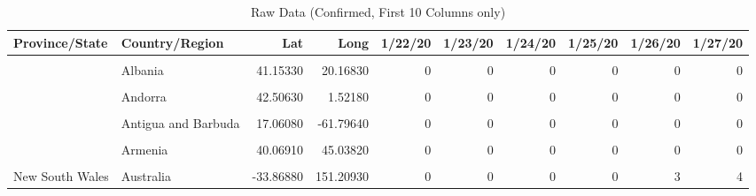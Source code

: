 \begin{table}[!h]

\caption{\label{tab:}Raw Data (Confirmed, First 10 Columns only)}
\centering
\fontsize{5}{7}\selectfont
\begin{tabular}[t]{llrrrrrrrr}
\toprule
Province/State & Country/Region & Lat & Long & 1/22/20 & 1/23/20 & 1/24/20 & 1/25/20 & 1/26/20 & 1/27/20\\
\midrule
\cellcolor{gray!6}{} & \cellcolor{gray!6}{Afghanistan} & \cellcolor{gray!6}{33.93911} & \cellcolor{gray!6}{67.70995} & \cellcolor{gray!6}{0} & \cellcolor{gray!6}{0} & \cellcolor{gray!6}{0} & \cellcolor{gray!6}{0} & \cellcolor{gray!6}{0} & \cellcolor{gray!6}{0}\\
 & Albania & 41.15330 & 20.16830 & 0 & 0 & 0 & 0 & 0 & 0\\
\cellcolor{gray!6}{} & \cellcolor{gray!6}{Algeria} & \cellcolor{gray!6}{28.03390} & \cellcolor{gray!6}{1.65960} & \cellcolor{gray!6}{0} & \cellcolor{gray!6}{0} & \cellcolor{gray!6}{0} & \cellcolor{gray!6}{0} & \cellcolor{gray!6}{0} & \cellcolor{gray!6}{0}\\
 & Andorra & 42.50630 & 1.52180 & 0 & 0 & 0 & 0 & 0 & 0\\
\cellcolor{gray!6}{} & \cellcolor{gray!6}{Angola} & \cellcolor{gray!6}{-11.20270} & \cellcolor{gray!6}{17.87390} & \cellcolor{gray!6}{0} & \cellcolor{gray!6}{0} & \cellcolor{gray!6}{0} & \cellcolor{gray!6}{0} & \cellcolor{gray!6}{0} & \cellcolor{gray!6}{0}\\
\addlinespace
 & Antigua and Barbuda & 17.06080 & -61.79640 & 0 & 0 & 0 & 0 & 0 & 0\\
\cellcolor{gray!6}{} & \cellcolor{gray!6}{Argentina} & \cellcolor{gray!6}{-38.41610} & \cellcolor{gray!6}{-63.61670} & \cellcolor{gray!6}{0} & \cellcolor{gray!6}{0} & \cellcolor{gray!6}{0} & \cellcolor{gray!6}{0} & \cellcolor{gray!6}{0} & \cellcolor{gray!6}{0}\\
 & Armenia & 40.06910 & 45.03820 & 0 & 0 & 0 & 0 & 0 & 0\\
\cellcolor{gray!6}{Australian Capital Territory} & \cellcolor{gray!6}{Australia} & \cellcolor{gray!6}{-35.47350} & \cellcolor{gray!6}{149.01240} & \cellcolor{gray!6}{0} & \cellcolor{gray!6}{0} & \cellcolor{gray!6}{0} & \cellcolor{gray!6}{0} & \cellcolor{gray!6}{0} & \cellcolor{gray!6}{0}\\
New South Wales & Australia & -33.86880 & 151.20930 & 0 & 0 & 0 & 0 & 3 & 4\\
\bottomrule
\end{tabular}
\end{table}


